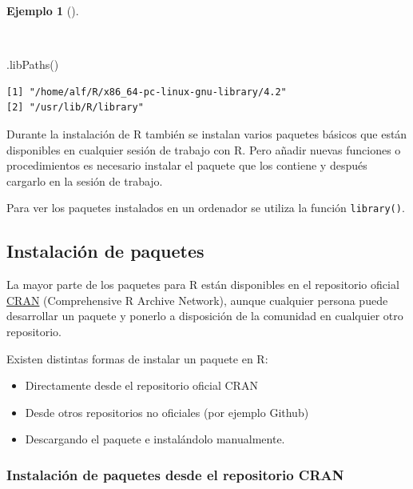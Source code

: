 \documentclass[
  a4paper,
]{scrreport}
\newenvironment{Shaded}{\begin{snugshade}}{\end{snugshade}}
\newcommand{\FunctionTok}[1]{\textcolor[rgb]{0.28,0.35,0.67}{#1}}
\newcommand{\NormalTok}[1]{\textcolor[rgb]{0.00,0.23,0.31}{#1}}
\providecommand{\tightlist}{%
  \setlength{\itemsep}{0pt}\setlength{\parskip}{0pt}}\usepackage{longtable,booktabs,array}
\theoremstyle{definition}
\theoremstyle{definition}
\newtheorem{example}{Ejemplo}[chapter]
\theoremstyle{remark}
\begin{document}
\begin{example}[]\protect\hypertarget{exm-ubiacion-biblioteca-paquetes}{}\label{exm-ubiacion-biblioteca-paquetes}

~

\begin{Shaded}
\begin{Highlighting}[]
\FunctionTok{.libPaths}\NormalTok{()}
\end{Highlighting}
\end{Shaded}

\begin{verbatim}
[1] "/home/alf/R/x86_64-pc-linux-gnu-library/4.2"
[2] "/usr/lib/R/library"                         
\end{verbatim}

\end{example}

Durante la instalación de R también se instalan varios paquetes básicos
que están disponibles en cualquier sesión de trabajo con R. Pero añadir
nuevas funciones o procedimientos es necesario instalar el paquete que
los contiene y después cargarlo en la sesión de trabajo.

Para ver los paquetes instalados en un ordenador se utiliza la función
\texttt{library()}.

\subsection{Instalación de paquetes}\label{instalaciuxf3n-de-paquetes}

La mayor parte de los paquetes para R están disponibles en el
repositorio oficial
\href{Comprehensive\%20R\%20Archive\%20Network}{CRAN} (Comprehensive R
Archive Network), aunque cualquier persona puede desarrollar un paquete
y ponerlo a disposición de la comunidad en cualquier otro repositorio.

Existen distintas formas de instalar un paquete en R:

\begin{itemize}
\tightlist
\item
  Directamente desde el repositorio oficial CRAN
\item
  Desde otros repositorios no oficiales (por ejemplo Github)
\item
  Descargando el paquete e instalándolo manualmente.
\end{itemize}

\subsubsection{Instalación de paquetes desde el repositorio
CRAN}\label{instalaciuxf3n-de-paquetes-desde-el-repositorio-cran}
\end{document}
